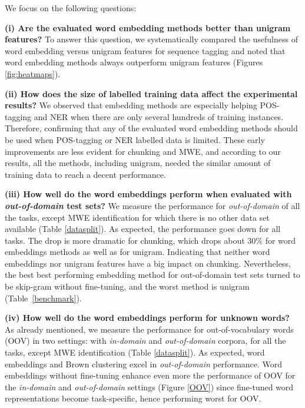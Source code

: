 We focus on the following questions:

\textbf{(i) Are the evaluated word embedding methods better than unigram features?}
To answer this question, we systematically compared the usefulness of word embedding versus
unigram features for sequence tagging and noted that word embedding methods always outperform 
unigram features (Figures \ref{fig:heatmaps}). 

\textbf{(ii) How does the size of labelled training data affect the experimental results?}
We observed that embedding methods are especially helping POS-tagging and NER when there are only several hundreds of training instances. 
Therefore, confirming that any of the evaluated word embedding methods should be used when POS-tagging or NER labelled data is limited.
These early improvements are less evident for chunking and MWE, and according to our results, all the methods, including unigram, needed the similar amount of training data to reach a decent performance.

\textbf{(iii) How well do the word embeddings perform when evaluated with \textit{out-of-domain} test sets?}
We measure the performance for \textit{out-of-domain} of all the tasks, except MWE identification for which there is no other data set available (Table \ref{datasplit}).
As expected, the performance goes down for all tasks. The drop is more dramatic for chunking, which drops about 30\% for word embeddings methods as well as for unigram. 
Indicating that neither word embeddings nor unigram features have a big impact on chunking.
Nevertheless, the best best performing embedding method for out-of-domain test sets turned to be skip-gram without fine-tuning, and the worst method is unigram (Table~\ref{benchmark}).

\textbf{(iv) How well do the word embeddings perform for unknown words?}
As already mentioned, we measure the performance for out-of-vocabulary words (OOV)
in two settings: with \textit{in-domain} and \textit{out-of-domain} corpora, for all the tasks, except MWE identification (Table \ref{datasplit}).
As expected, word embeddings and Brown clustering excel in \textit{out-of-domain} performance.
Word embeddings without fine-tuning enhance even more the performance of OOV 
for the \textit{in-domain} and \textit{out-of-domain} settings (Figure \ref{OOV}) since fine-tuned
word representations become task-specific, hence performing worst for OOV.


